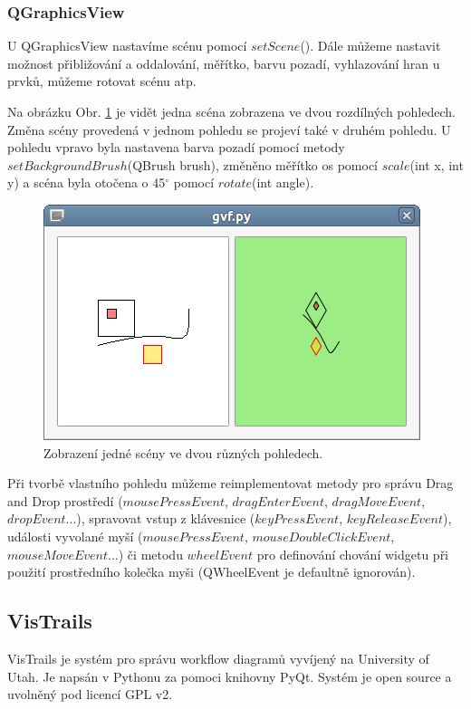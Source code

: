 \subsubsection*{QGraphicsView}
U QGraphicsView nastavíme scénu pomocí $setScene$(). Dále můžeme nastavit možnost přibližování a oddalování, měřítko, barvu pozadí, vyhlazování hran u prvků, můžeme rotovat scénu atp.

Na obrázku Obr. \ref{gsf} je vidět jedna scéna zobrazena ve dvou rozdílných pohledech. Změna scény provedená v jednom pohledu se projeví také v druhém pohledu. U pohledu vpravo byla nastavena barva pozadí pomocí metody $setBackgroundBrush$(QBrush brush), změněno měřítko os pomocí $scale$(int x, int y) a scéna byla otočena o 45$^\circ$ pomocí $rotate$(int angle). \\

\begin{figure}[h]
	\centering
	\includegraphics[scale=0.7]{pictures/qt/gsf}
	\caption{Zobrazení jedné scény ve dvou různých pohledech.}
	\label{gsf}
\end{figure}

Při tvorbě vlastního pohledu můžeme reimplementovat metody pro správu Drag and Drop prostředí ($mousePressEvent$, $dragEnterEvent$, $dragMoveEvent$, $dropEvent$...), spravovat vstup z klávesnice ($keyPressEvent$, $keyReleaseEvent$), události vyvolané myší ($mousePressEvent$, $mouseDoubleClickEvent$, $mouseMoveEvent$...) či metodu $wheelEvent$ pro definování chování widgetu při použití prostředního kolečka myši (QWheelEvent je defaultně ignorován).

\subsection{VisTrails}

VisTrails je systém pro správu workflow diagramů vyvíjený na University of Utah. Je napsán v Pythonu za pomoci knihovny PyQt. Systém je open source a uvolněný pod licencí GPL v2. 

